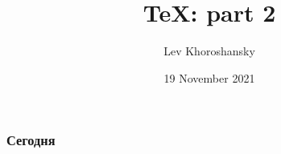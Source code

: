 \documentclass{beamer}
\title[\TeX: part 2]{\TeX: part 2}
\author{Lev Khoroshansky}
\institute[HSE]{Higher School of Economics}
\date{19 November 2021}
\begin{document}
    \frame[plain]{\titlepage}
    
    \begin{frame}
    \frametitle{Сегодня}
    \tableofcontents
    \end{frame}
    
    
    
    
    
    
\end{document}
